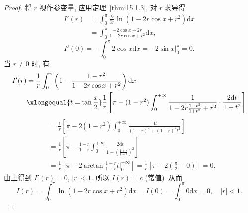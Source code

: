 \begin{proof}
将 $r$ 视作参变量, 应用定理~\ref{thm:15.1.3}, 对 $r$ 求导得
\[
  \begin{aligned}
    I'(r)&=\int_{0}^{\pi}\frac{\partial}{\partial r}\ln\left(1-2r\cos x+r^{2}\right)\mathrm{d}x\\
    &=\int_{0}^{\pi}\frac{-2\cos x+2r}{1-2r\cos x+r^{2}}\mathrm{d}x,
  \end{aligned}
\]
\[
  I'(0)=-\int_{0}^{\pi}2\cos x\mathrm{d}x=-\left.2\sin x\right|_{0}^{\pi}=0.
\]
当 $r\neq0$ 时, 有
\[
  \begin{aligned}
    I'(r)&=\frac{1}{r}\int_{0}^{\pi}\left(1-\frac{1-r^{2}}{1-2r\cos x+r^{2}}\right)\mathrm{d}x\\
    &\xlongequal{t=\tan\frac{x}{2}}\frac{1}{r}\left[\pi-(1-r^{2})\int_{0}^{+\infty}\frac{1}{1-2r\frac{1-t^{2}}{1+t^{2}}+r^{2}}\cdot\frac{2\mathrm{d}t}{1+t^{2}}\right]
  \end{aligned}
\]
\[
  \begin{aligned}
    &=\frac{1}{r}\left[\pi-2(1-r^{2})\int_{0}^{+\infty}\frac{\mathrm{d}t}{(1-r)^{2}+(1+r)^{2}t^{2}}\right]\\
    &=\frac{1}{r}\left[\pi-\frac{1+r}{1-r}\int_{0}^{+\infty}\frac{2\mathrm{d}t}{1+\left(\frac{1+r}{1-r}\right)^{2}}\right]\\
    &=\frac{1}{r}\left[\pi-2\arctan\frac{1+r}{1-r}t\bigg|_{0}^{+\infty}\right]=\frac{1}{r}\left[\pi-2\left(\frac{\pi}{2}-0\right)\right]=0.
  \end{aligned}
\]
由上得到 $I'(r)=0$, $|r|<1$. 所以 $I(r)=c$ (常值). 从而
\[
  I(r)=\int_{0}^{\pi}\ln(1-2r\cos x+r^{2})\mathrm{d}x=I(0)=\int_{0}^{\pi}0\mathrm{d}x=0,\quad|r|<1.
\]
\end{proof}

